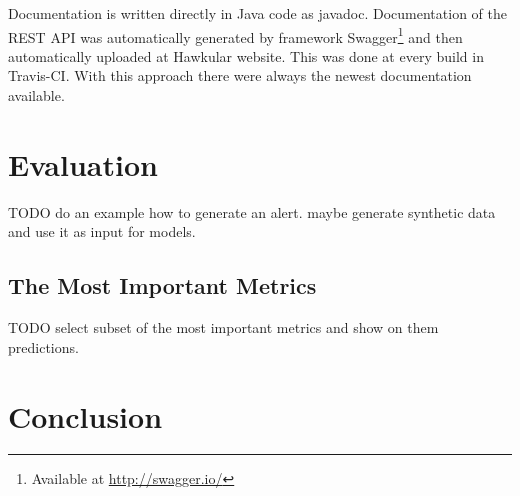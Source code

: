     Documentation is written directly in Java code as javadoc. Documentation of the REST
    API was automatically generated by framework Swagger\footnote{Available at
    \url{http://swagger.io/}} and then automatically uploaded at Hawkular website. This
    was done at every build in Travis-CI. With this approach there were always the newest 
    documentation available.

\chapter{Evaluation}
TODO do an example how to generate an alert.
maybe generate synthetic data and use it as input for models.

    \section{The Most Important Metrics}
    TODO select subset of the most important metrics and show on them predictions.

\chapter{Conclusion}

